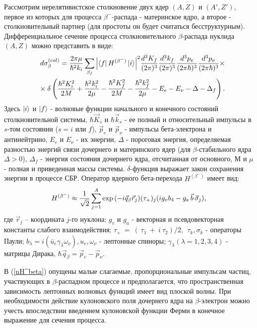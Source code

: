 \documentclass[14pt, a4paper]{article}
\numberwithin{figure}{section}
\numberwithin{equation}{section}
\begin{document}
Рассмотрим нерелятивистское столкновение двух ядер $(A,Z)$ и $(A',Z')$,
первое из которых для процесса $\beta^-$-распада - материнское ядро, а второе
- столкновительный партнер (для простоты он будет считаться
бесструктурным).
Дифференциальное сечение процесса столкновительного $\beta$-распада
нуклида $(A,Z)$ можно  представить в виде:
\begin{eqnarray}\label{ds}
&&d\sigma^{(col)}_\beta=\frac{2\pi\mu}{\hbar^2k_i}\sum_{\beta_f}{\left| \bra{f} H^{(\beta^-)}
	\ket{i}\right|}^2{d^3 K_f\over{(2\pi)^3}}{d^3 k_f\over{(2\pi)^3}}
{d^3 p_e\over{(2\pi\hbar)^3}}{d^3 p_\nu\over{(2\pi\hbar)^3}}\times\nonumber\\
&&\times\;\delta\left({\hbar^2 K_i^2\over{2 M}}+{\hbar^2 k_i^2\over{2\mu}}-{\hbar^2 K_f^2\over{2 M}}-
{\hbar^2 k_f^2\over{2\mu}}-E_e-E_\nu-\Delta-\Delta_f\right).
\end{eqnarray}
Здесь $\ket{i}$ и $\ket{f}$ - волновые функции начального и конечного состояний
столкновительной системы,
$\hbar \vec K_s$ и $\hbar \vec k_s$ - ее полный и относительный импульсы
в $s$-том состоянии ($s=i$ или $f$),
$\vec p_e$ и $\vec p_\nu$ - импульсы бета-электрона и антинейтрино,
$E_e$ и $E_\nu$ - их энергии,
$\Delta$ - пороговая энергия, определяемая разностью энергий связи
дочернего и материнского ядер (для $\beta$-стабильного ядра $\Delta>0$),
$\Delta_f$  - энергия состояния дочернего ядра, отсчитанная от
основного,
$М$ и $\mu$ - полная и приведенная массы системы.
$\delta$-функция выражает закон сохранения энергии в процессе СБР.
Оператор ядерного бета-перехода  $H^{(\beta^-)}$ имеет вид:
\begin{eqnarray}\label{nH^beta}
H^{(\beta^-)}\approx {{1}\over{\sqrt{2}}}\sum_{j=1}^{A} \exp{( -i \vec q_\beta \vec r_j)}
(\tau_+)_j ( i g_v b_4 - g_a\, \vec b\, \vec \sigma_j ),
\end{eqnarray}
где $\vec r_j$ -- координата $j$-го нуклона;
$g_v$ и $g_a$ - векторная и псевдовекторная константы слабого
взаимодействия;
$\tau_+~=~(~\tau_1~+~i~\tau_2)/2$, $\;\tau_k,\sigma_k$ - операторы Паули;
$b_\lambda=i ( \bar u_e \gamma_\lambda \omega_\nu), u_e, \omega_\nu$ - лептонные
спиноры; $\gamma_\lambda (\lambda = 1,2,3,4 )$ - матрицы Дирака,
$\hbar \vec q_\beta=\vec p_e-\vec p_\nu$.

В (\ref{nH^beta}) опущены малые слагаемые, пропорциональные импульсам частиц,
участвующих в $\beta$-распадном процессе и предполагается, что пространственная
зависимость лептонных волновых функций имеет вид плоской волны.
При необходимости действие
кулоновского поля дочернего ядра на $\beta$-электрон можно учесть
впоследствии введением кулоновской функции
Ферми в конечное выражение для сечения процесса.
\end{document}
